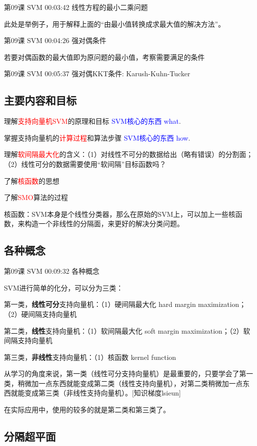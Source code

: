 \documentclass[UTF8]{ctexart}
\begin{document}
第09课 SVM 00:03:42 线性方程的最小二乘问题

此处是举例子，用于解释上面的“由最小值转换成求最大值的解决方法”。

第09课 SVM 00:04:26 强对偶条件

若要对偶函数的最大值即为原问题的最小值，考察需要满足的条件

第09课 SVM 00:05:37 强对偶KKT条件: Karush-Kuhn-Tucker

\subsection{主要内容和目标}

理解\textcolor{red}{支持向量机SVM}的原理和目标  \textcolor{blue}{SVM核心的东西 what}.

掌握支持向量机的\textcolor{red}{计算过程}和算法步骤  \textcolor{blue}{SVM核心的东西 how}.

理解\textcolor{red}{软间隔最大化}的含义：（1）对线性不可分的数据给出（略有错误）的分割面；（2）线性可分的数据需要使用“软间隔”目标函数吗？

了解\textcolor{red}{核函数}的思想

了解\textcolor{red}{SMO}算法的过程

核函数：SVM本身是个线性分类器，那么在原始的SVM上，可以加上一些核函数，来构造一个非线性的分隔面，来更好的解决分类问题。

\subsection{各种概念}

第09课 SVM 00:09:32 各种概念

SVM进行简单的化分，可以分为三类：

第一类，\textbf{线性可分}支持向量机：（1）硬间隔最大化 hard margin maximization；（2）硬间隔支持向量机

第二类，\textbf{线性}支持向量机：（1）软间隔最大化 soft margin maximization；（2）软间隔支持向量机

第三类，\textbf{非线性}支持向量机：（1）核函数 kernel function

从学习的角度来说，第一类（线性可分支持向量机）是最重要的，只要学会了第一类，稍微加一点东西就能变成第二类（线性支持向量机），对第二类稍微加一点东西就能变成第三类（非线性支持向量机）。[知识梯度lsieun]

在实际应用中，使用的较多的就是第二类和第三类了。

\subsection{分隔超平面}
\end{document}
